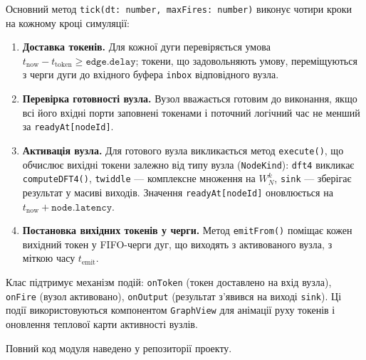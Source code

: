 Основний метод \texttt{tick(dt: number, maxFires: number)} виконує чотири
кроки на кожному кроці симуляції:
\begin{enumerate}
  \item \textbf{Доставка токенів.} Для кожної дуги перевіряється умова
    $t_{\text{now}} - t_{\text{token}} \geq \mathtt{edge.delay}$; токени, що
    задовольняють умову, переміщуються з черги дуги до вхідного буфера
    \texttt{inbox} відповідного вузла.
  \item \textbf{Перевірка готовності вузла.} Вузол вважається готовим до
    виконання, якщо всі його вхідні порти заповнені токенами і поточний
    логічний час не менший за \texttt{readyAt[nodeId]}.
  \item \textbf{Активація вузла.} Для готового вузла викликається метод
    \texttt{execute()}, що обчислює вихідні токени залежно від типу вузла
    (\texttt{NodeKind}): \texttt{dft4} викликає \texttt{computeDFT4()},
    \texttt{twiddle} --- комплексне множення на $W_N^k$, \texttt{sink} ---
    зберігає результат у масиві виходів.
    Значення \texttt{readyAt[nodeId]} оновлюється на
    $t_{\text{now}} + \mathtt{node.latency}$.
  \item \textbf{Постановка вихідних токенів у черги.} Метод
    \texttt{emitFrom()} поміщає кожен вихідний токен у FIFO-черги дуг,
    що виходять з активованого вузла, з міткою часу $t_{\text{emit}}$.
\end{enumerate}

Клас підтримує механізм подій: \texttt{onToken} (токен доставлено на вхід
вузла), \texttt{onFire} (вузол активовано), \texttt{onOutput} (результат
з'явився на виході \texttt{sink}).
Ці події використовуються компонентом \texttt{GraphView} для анімації
руху токенів і оновлення теплової карти активності вузлів.

Повний код модуля наведено у репозиторії проекту.
